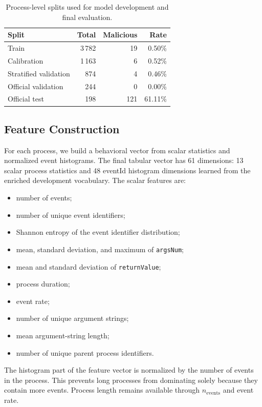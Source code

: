 \documentclass[10pt,journal,compsoc]{IEEEtran}
\begin{document}
\begin{table}[t]
\centering
\caption{Process-level splits used for model development and final evaluation.}
\label{tab:splits_new}
\begin{tabular}{lrrr}
\toprule
\textbf{Split} & \textbf{Total} & \textbf{Malicious} & \textbf{Rate} \\
\midrule
Train & 3\,782 & 19 & 0.50\% \\
Calibration & 1\,163 & 6 & 0.52\% \\
Stratified validation & 874 & 4 & 0.46\% \\
Official validation & 244 & 0 & 0.00\% \\
Official test & 198 & 121 & 61.11\% \\
\bottomrule
\end{tabular}
\end{table}

\subsection{Feature Construction}

For each process, we build a behavioral vector from scalar statistics and normalized event histograms. The final tabular vector has 61 dimensions: 13 scalar process statistics and 48 eventId histogram dimensions learned from the enriched development vocabulary. The scalar features are:
\begin{itemize}
    \item number of events;
    \item number of unique event identifiers;
    \item Shannon entropy of the event identifier distribution;
    \item mean, standard deviation, and maximum of \texttt{argsNum};
    \item mean and standard deviation of \texttt{returnValue};
    \item process duration;
    \item event rate;
    \item number of unique argument strings;
    \item mean argument-string length;
    \item number of unique parent process identifiers.
\end{itemize}

The histogram part of the feature vector is normalized by the number of events in the process. This prevents long processes from dominating solely because they contain more events. Process length remains available through $n_{\text{events}}$ and event rate.
\end{document}
